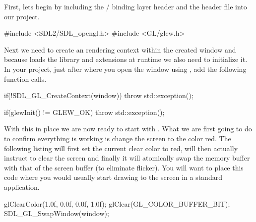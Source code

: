 \documentclass[10pt]{article}
\begin{document}
First, lets begin by including the / binding
layer header and the  header file into our project.

\begin{Listing}

  #include <SDL2/SDL_opengl.h>
  #include <GL/glew.h>

\end{Listing}

Next we need to create an  rendering context within
the created  window and because  loads the
 library and extensions at runtime we also need to initialize
it. In your project, just after where you open the  window
using , add the following function calls.

\begin{Listing}

  if(!SDL_GL_CreateContext(window))
  {
    throw std::exception();
  }

  if(glewInit() != GLEW_OK)
  {
    throw std::exception();
  }

\end{Listing}


With this in place we are now ready to start with . What
we are first going to do to confirm everything is working is change
the screen to the color red. The following listing will first set the
current  clear color to red, will then actually instruct
 to clear the screen and finally it will atomically swap the
 memory buffer with that of the screen buffer (to eliminate
flicker). You will want to place this code where you would usually start
drawing to the screen in a standard  application.

\begin{Listing}

  glClearColor(1.0f, 0.0f, 0.0f, 1.0f);
  glClear(GL_COLOR_BUFFER_BIT);
  SDL_GL_SwapWindow(window);

\end{Listing}

\end{document}
